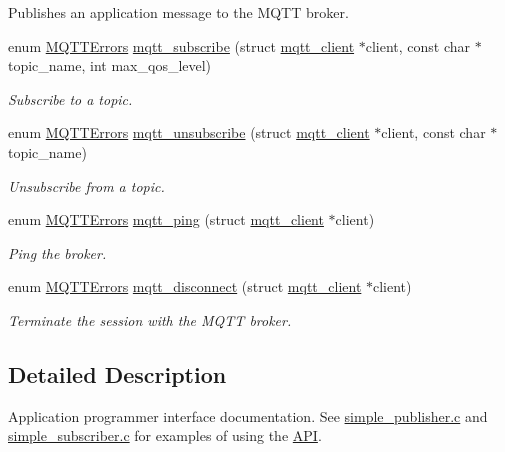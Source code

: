 \begin{DoxyCompactItemize}
\begin{DoxyCompactList}
Publishes an application message to the M\+Q\+TT broker. \end{DoxyCompactList}\item 
enum \hyperlink{group__api_gad0c901a8d30691ed0ca17915b691b7e7}{M\+Q\+T\+T\+Errors} \hyperlink{group__api_gaea5da9b546f6e91eb77c9eff9c478de5}{mqtt\+\_\+subscribe} (struct \hyperlink{structmqtt__client}{mqtt\+\_\+client} $\ast$client, const char $\ast$topic\+\_\+name, int max\+\_\+qos\+\_\+level)
\begin{DoxyCompactList}\small\item\em Subscribe to a topic. \end{DoxyCompactList}\item 
enum \hyperlink{group__api_gad0c901a8d30691ed0ca17915b691b7e7}{M\+Q\+T\+T\+Errors} \hyperlink{group__api_ga08d16571dfefa690698c0cca5cca7a1d}{mqtt\+\_\+unsubscribe} (struct \hyperlink{structmqtt__client}{mqtt\+\_\+client} $\ast$client, const char $\ast$topic\+\_\+name)
\begin{DoxyCompactList}\small\item\em Unsubscribe from a topic. \end{DoxyCompactList}\item 
enum \hyperlink{group__api_gad0c901a8d30691ed0ca17915b691b7e7}{M\+Q\+T\+T\+Errors} \hyperlink{group__api_gae472795684a1d973bfb89d075d17a29e}{mqtt\+\_\+ping} (struct \hyperlink{structmqtt__client}{mqtt\+\_\+client} $\ast$client)
\begin{DoxyCompactList}\small\item\em Ping the broker. \end{DoxyCompactList}\item 
enum \hyperlink{group__api_gad0c901a8d30691ed0ca17915b691b7e7}{M\+Q\+T\+T\+Errors} \hyperlink{group__api_ga95d9981735ab4495d3d65e8056611126}{mqtt\+\_\+disconnect} (struct \hyperlink{structmqtt__client}{mqtt\+\_\+client} $\ast$client)
\begin{DoxyCompactList}\small\item\em Terminate the session with the M\+Q\+TT broker. \end{DoxyCompactList}\end{DoxyCompactItemize}


\subsection{Detailed Description}
Application programmer interface documentation. See \hyperlink{simple_publisher_8c-example}{simple\+\_\+publisher.\+c} and \hyperlink{simple_subscriber_8c-example}{simple\+\_\+subscriber.\+c} for examples of using the \hyperlink{group__api}{A\+PI}. 

